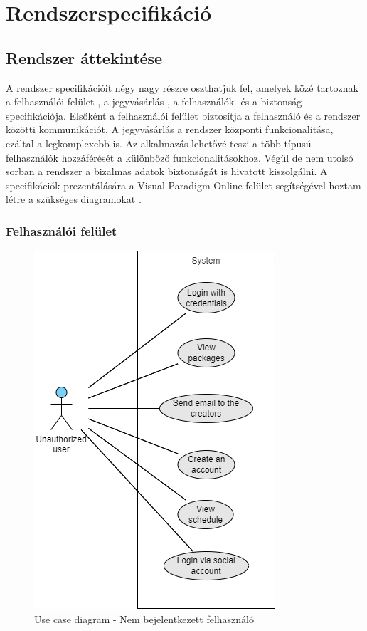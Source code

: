 \chapter{Rendszerspecifikáció} \label{fejezet3}

\section {Rendszer áttekintése}

A rendszer specifikációit négy nagy részre oszthatjuk fel, amelyek közé tartoznak a felhasználói felület-, a jegyvásárlás-, a felhasználók- és a biztonság specifikációja. Elsőként a felhasználói felület biztosítja a felhasználó és a rendszer közötti kommunikációt. A jegyvásárlás a rendszer központi funkcionalitása, ezáltal a legkomplexebb is. Az alkalmazás lehetővé teszi a több típusú felhasználók hozzáférését a különbőző funkcionalitásokhoz. Végül de nem utolsó sorban a rendszer a bizalmas adatok biztonságát is hivatott kiszolgálni. A specifikációk prezentálására a Visual Paradigm Online felület segítségével hoztam létre a szükséges diagramokat .

\subsection {Felhasználói felület}

\begin{figure}[!h]
	\centering
	\includegraphics[scale=0.7]{images/useCaseNA}
	\caption{Use case diagram - Nem bejelentkezett felhasználó}
	\label{abra:useCaseNA}
\end{figure}

